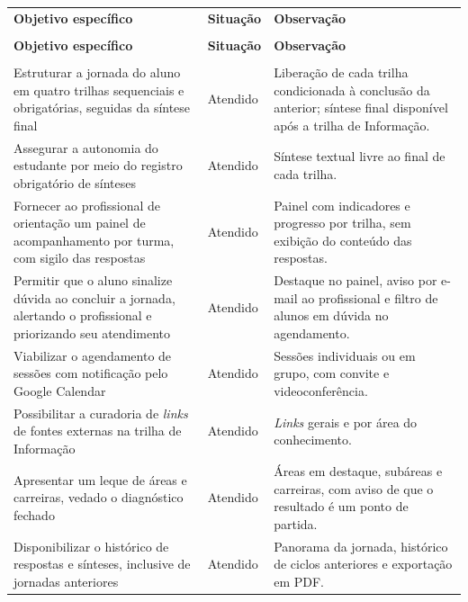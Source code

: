 {\ABNTEXfontereduzida
\renewcommand{\arraystretch}{1.25}
\begin{xltabular}{\textwidth}{|>{\raggedright\arraybackslash}X|>{\raggedright\arraybackslash}p{2.2cm}|>{\raggedright\arraybackslash}p{5.8cm}|}
 \\[0.3em]
\hline
\textbf{Objetivo específico} & \textbf{Situação} & \textbf{Observação} \\
\hline
\endfirsthead
{} \\
\hline
\textbf{Objetivo específico} & \textbf{Situação} & \textbf{Observação} \\
\hline
\endhead
{} \\
\endfoot
\endlastfoot
Estruturar a jornada do aluno em quatro trilhas sequenciais e obrigatórias, seguidas da síntese final & Atendido & Liberação de cada trilha condicionada à conclusão da anterior; síntese final disponível após a trilha de Informação. \\
\hline
Assegurar a autonomia do estudante por meio do registro obrigatório de sínteses & Atendido & Síntese textual livre ao final de cada trilha. \\
\hline
Fornecer ao profissional de orientação um painel de acompanhamento por turma, com sigilo das respostas & Atendido & Painel com indicadores e progresso por trilha, sem exibição do conteúdo das respostas. \\
\hline
Permitir que o aluno sinalize dúvida ao concluir a jornada, alertando o profissional e priorizando seu atendimento & Atendido & Destaque no painel, aviso por e-mail ao profissional e filtro de alunos em dúvida no agendamento. \\
\hline
Viabilizar o agendamento de sessões com notificação pelo Google Calendar & Atendido & Sessões individuais ou em grupo, com convite e videoconferência. \\
\hline
Possibilitar a curadoria de \textit{links} de fontes externas na trilha de Informação & Atendido & \textit{Links} gerais e por área do conhecimento. \\
\hline
Apresentar um leque de áreas e carreiras, vedado o diagnóstico fechado & Atendido & Áreas em destaque, subáreas e carreiras, com aviso de que o resultado é um ponto de partida. \\
\hline
Disponibilizar o histórico de respostas e sínteses, inclusive de jornadas anteriores & Atendido & Panorama da jornada, histórico de ciclos anteriores e exportação em PDF. \\

\end{xltabular}}
